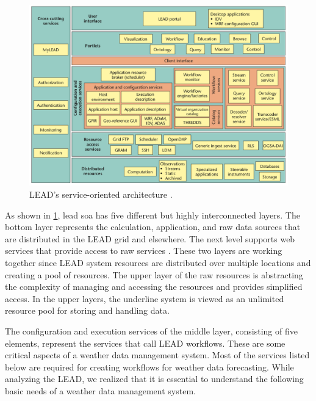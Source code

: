 \begin{figure}[htp]
    \centering
    \includegraphics[width=1\textwidth]{lit/lead/LEADs-service-oriented-architecture-A-wide-variety-of-services-and-resources-grouped_W640.png}
    \caption[LEAD's service-oriented architecture]{LEAD's service-oriented architecture \cite{Droegemeier2005Service-OrientedWeather}.}
    \label{fi:lead_soa}
\end{figure}

As shown in \cref{fi:lead_soa}, \acrshort{lead} \acrshort{soa} has five different but highly interconnected layers. The bottom layer represents the calculation, application, and raw data sources that are distributed in the LEAD grid and elsewhere. The next level supports web services that provide access to raw services \cite{Droegemeier2005Service-OrientedWeather}. These two layers are working together since LEAD system resources are distributed over multiple locations and creating a pool of resources. The upper layer of the raw resources is abstracting the complexity of managing and accessing the resources and provides simplified access. In the upper layers, the underline system is viewed as an unlimited resource pool for storing and handling data.

The configuration and execution services of the middle layer, consisting of five elements, represent the services that call LEAD workflows. These are some critical aspects of a weather data management system. Most of the services listed below are required for creating workflows for weather data forecasting. While analyzing the LEAD, we realized that it is essential to understand the following basic needs of a weather data management system.

